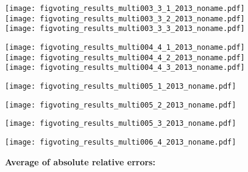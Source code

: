 \begin{frame}[plain]
\begin{frame}[plain]
\begin{frame}[plain]
\begin{frame}[plain]
\begin{frame}[plain]
\begin{frame}[plain]
\begin{frame}[plain]
\begin{frame}[plain]
\begin{frame}[plain]
\begin{frame}[plain]
\begin{frame}[plain]
\begin{frame}[plain]
\begin{frame}[plain]
\begin{frame}[plain]
\begin{frame}[plain]
  

  \texttt{[image: figvoting\_results\_multi003\_3\_1\_2013\_noname.pdf]}\\
  \texttt{[image: figvoting\_results\_multi003\_3\_2\_2013\_noname.pdf]}\\
  \texttt{[image: figvoting\_results\_multi003\_3\_3\_2013\_noname.pdf]}


  

  \texttt{[image: figvoting\_results\_multi004\_4\_1\_2013\_noname.pdf]}\\
  \texttt{[image: figvoting\_results\_multi004\_4\_2\_2013\_noname.pdf]}\\
  \texttt{[image: figvoting\_results\_multi004\_4\_3\_2013\_noname.pdf]}


\begin{frame}[plain]
  

  \texttt{[image: figvoting\_results\_multi005\_1\_2013\_noname.pdf]}


\begin{frame}[plain]
  

  \texttt{[image: figvoting\_results\_multi005\_2\_2013\_noname.pdf]}


\begin{frame}[plain]
  

  \texttt{[image: figvoting\_results\_multi005\_3\_2013\_noname.pdf]}


\begin{frame}[plain]
  

  \texttt{[image: figvoting\_results\_multi006\_4\_2013\_noname.pdf]}



  \small
  \textbf{Average of absolute relative errors:}


\end{frame}
\end{frame}
\end{frame}
\end{frame}
\end{frame}
\end{frame}
\end{frame}
\end{frame}
\end{frame}
\end{frame}
\end{frame}
\end{frame}
\end{frame}
\end{frame}
\end{frame}
\end{frame}
\end{frame}
\end{frame}
\end{frame}
